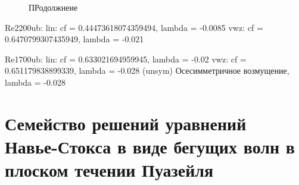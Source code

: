 \begin{figure}
\caption{ПРодолжнеие} 
\label{pipeTW_contin_pic}
\end{figure}


Re2200ub:
lin: cf = 0.44473618074359494, lambda = -0.0085
vwz: cf = 0.6470799307435949, lambda = -0.021

Re1700ub:
lin: cf = 0.633021694959945, lambda = -0.02
vwz: cf = 0.651179838899339, lambda = -0.028 (unsym)
        Осесимметричное возмущение, lambda = -0.028


\section{Семейство решений уравнений Навье-Стокса в виде бегущих волн в плоском течении Пуазейля}

